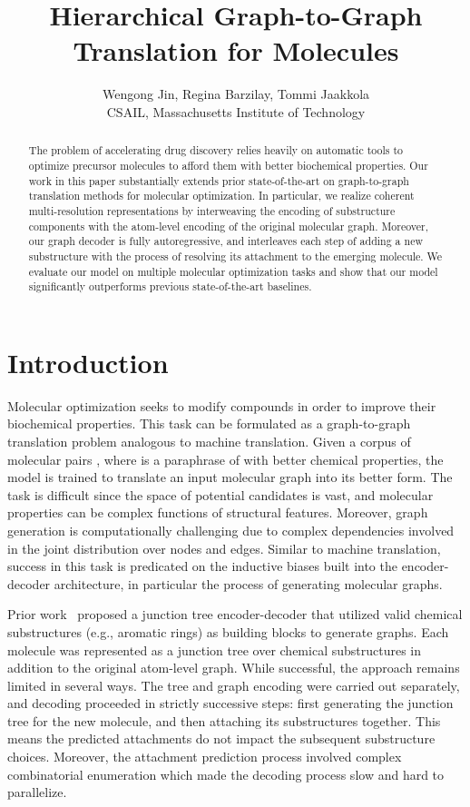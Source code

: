 \documentclass{article} \usepackage{iclr2020_conference,times}
\title{Hierarchical Graph-to-Graph Translation for Molecules}
\author{Wengong Jin,\;
  Regina Barzilay,\;
  Tommi Jaakkola \\
  CSAIL, Massachusetts Institute of Technology \\
}
\begin{document}
\maketitle
\begin{abstract}
The problem of accelerating drug discovery relies heavily on automatic tools to optimize precursor molecules to afford them with better biochemical properties. Our work in this paper substantially extends prior state-of-the-art on graph-to-graph translation methods for molecular optimization. In particular, we realize coherent multi-resolution representations by interweaving the encoding of substructure components with the atom-level encoding of the original molecular graph. Moreover, our graph decoder is fully autoregressive, and interleaves each step of adding a new substructure with the process of resolving its attachment to the emerging molecule. We evaluate our model on multiple molecular optimization tasks and show that our model significantly outperforms previous state-of-the-art baselines.
\end{abstract}
 \section{Introduction}

Molecular optimization seeks to modify compounds in order to improve their biochemical properties. 
This task can be formulated as a graph-to-graph translation problem analogous to machine translation. Given a corpus of molecular pairs , where  is a paraphrase of  with better chemical properties, the model is trained to translate an input molecular graph into its better form.
The task is difficult since the space of potential candidates is vast, and molecular properties can be complex functions of structural features.
Moreover, graph generation is computationally challenging due to complex dependencies involved in the joint distribution over nodes and edges. 
Similar to machine translation, success in this task is predicated on the inductive biases built into the encoder-decoder architecture, in particular the process of generating molecular graphs.

Prior work~\citep{jin2018learning} proposed a junction tree encoder-decoder that utilized valid chemical substructures (e.g., aromatic rings) as building blocks to generate graphs. Each molecule was represented as a junction tree over chemical substructures in addition to the original atom-level graph. 
While successful, the approach remains limited in several ways. 
The tree and graph encoding were carried out separately, and decoding proceeded in strictly successive steps: first generating the junction tree for the new molecule, and then attaching its substructures together. This means the predicted attachments do not impact the subsequent substructure choices.
Moreover, the attachment prediction process involved complex combinatorial enumeration which made the decoding process slow and hard to parallelize.
\end{document}
